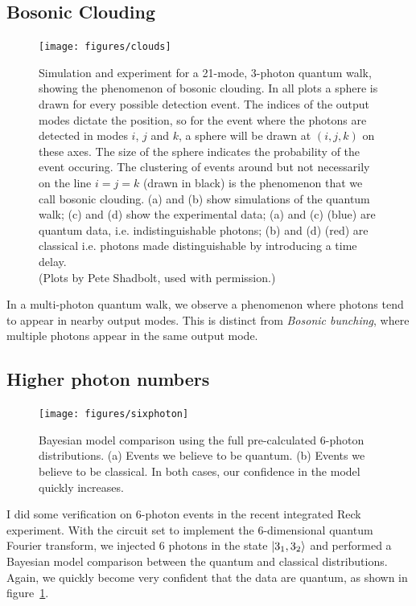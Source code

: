 \subsection{Bosonic Clouding}
\label{sec:Clouding}
\begin{figure}[t]
  \centering
  \texttt{[image: figures/clouds]}
  \caption[Bosonic clouding in a quantum walk]
  {Simulation and experiment for a 21-mode, 3-photon quantum walk, showing the
  phenomenon of bosonic clouding. In all plots a sphere is drawn for every
  possible detection event. The indices of the output modes dictate the
  position, so for the event where the photons are detected in modes \(i\),
  \(j\) and \(k\), a sphere will be drawn at \(\left(i,j,k\right)\) on these
  axes. The size of the sphere indicates the probability of the event occuring. 
  The clustering of events around but not necessarily on the line \(i=j=k\)
  (drawn in black) is the phenomenon that we call bosonic clouding.
  (a) and (b) show simulations of the quantum walk; (c) and (d) show the
  experimental data; (a) and (c) (blue) are quantum data, i.e. indistinguishable
  photons; (b) and (d) (red) are classical i.e. photons made distinguishable by
  introducing a time delay.\\
  (Plots by Pete Shadbolt, used with permission.)}
\end{figure}
In a multi-photon quantum walk, we observe a phenomenon where photons tend to
appear in nearby output modes. This is distinct from \emph{Bosonic bunching},
where multiple photons appear in the same output mode.

\subsection{Higher photon numbers}
\label{sec:SixPhoton}
\begin{figure}[t]
  \centering
  \texttt{[image: figures/sixphoton]}
  \caption[Bayesian model comparison on 6-photon events]
  {Bayesian model comparison using the full pre-calculated 6-photon
  distributions. (a) Events we believe to be quantum. (b) Events we believe to
  be classical. In both cases, our confidence in the model quickly increases.}
  \label{fig:sixphoton}
\end{figure}
I did some verification on 6-photon events in the recent integrated Reck
experiment. With the circuit set to implement the 6-dimensional quantum Fourier
transform, we injected 6 photons in the state \(\left|3_{1},3_{2}\right\rangle\) and
performed a Bayesian model comparison between the quantum and classical
distributions. Again, we quickly become very confident that the data are
quantum, as shown in figure~\ref{fig:sixphoton}.

